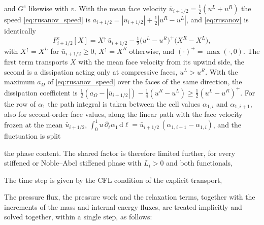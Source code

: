 and $G^e$ likewise with $v$. With the mean face velocity $\bar u_{i+1/2}=\tfrac12(u^L+u^R)$ the speed \eqref{eq:rusanov_speed} is
$a_{i+1/2}=|\bar u_{i+1/2}|+\tfrac12|u^R-u^L|$, and \eqref{eq:rusanov} is identically
\begin{equation}
F^e_{i+1/2}[X]=X^{\uparrow}\,\bar u_{i+1/2}-\tfrac12\big(u^L-u^R\big)^+\big(X^R-X^L\big),
\label{eq:rusanov_upwind}
\end{equation}
with $X^\uparrow=X^L$ for $\bar u_{i+1/2}\ge0$, $X^\uparrow=X^R$ otherwise, and $(\cdot)^+=\max(\cdot,0)$. The first term transports $X$ with the mean face velocity
from its upwind side, the second is a dissipation acting only at compressive faces, $u^L>u^R$. With the maximum $a_\Omega$ of
\eqref{eq:rusanov_speed} over the faces of the same direction, the dissipation coefficient is
$\tfrac12(a_\Omega-|\bar u_{i+1/2}|)-\tfrac14(u^R-u^L)\ge\tfrac12(u^L-u^R)^+$.
For the row of $\alpha_1$ the path integral is taken between the cell values $\alpha_{1,i}$ and $\alpha_{1,i+1}$, also for second-order face
values, along the linear path with the face velocity frozen at the mean
$\bar u_{i+1/2}$, $\int_0^1u\,\partial_\ell\alpha_1\,\mathrm d\ell=\bar u_{i+1/2}\,(\alpha_{1,i+1}-\alpha_{1,i})$, and the fluctuation is split

the phase content. The shared factor is therefore limited further, for every stiffened or Noble--Abel stiffened phase with $L_i>0$ and both
functionals,

The time step is given by the CFL condition of the explicit transport,

The pressure flux, the pressure work and the relaxation terms, together with the increments of the mass and internal energy
fluxes, are treated implicitly and solved together, within a single step, as follows:

